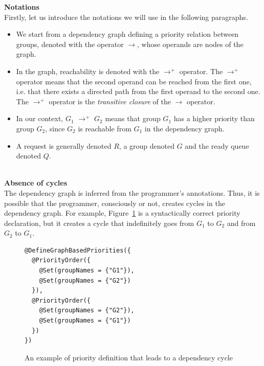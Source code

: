 \documentclass[11pt]{report}
\begin{document}
\textbf{Notations}\\
Firstly, let us introduce the notations we will use in the following paragraphs. 
\begin{itemize}
\item We start from a dependency graph defining a priority relation between groups, denoted with the operator $\longrightarrow$, whose operands are nodes of the graph.
\item In the graph, reachability is denoted with the $\longrightarrow^{+}$ operator. The $\longrightarrow^{+}$ operator means that the second operand can be reached from the first one, i.e. that there exists a directed path from the first operand to the second one. The $\longrightarrow^{+}$ operator is the \emph{transitive closure} of the $\longrightarrow$ operator.
\item In our context, $G_1$ $\longrightarrow^{+}$ $G_2$ means that group $G_1$ has a higher priority than group $G_2$, since $G_2$ is reachable from $G_1$ in the dependency graph.
\item A request is generally denoted $R$, a group denoted $G$ and the ready queue denoted $Q$.
\end{itemize}\\

\textbf{Absence of cycles}\\
The dependency graph is inferred from the programmer's annotations. Thus, it is possible that the programmer, consciously or not, creates cycles in the dependency graph. For example, Figure~\ref{fig:cycle} is a  syntactically correct priority declaration, but it creates a cycle that indefinitely goes from $G_1$ to $G_2$ and from $G_2$ to $G_1$.

\begin{figure}[!ht]
	\lstset{language=java, numbers=left, numberstyle=\tiny, stepnumber=1, numbersep=5pt, basicstyle=\footnotesize}
	\begin{lstlisting}[frame=single]
@DefineGraphBasedPriorities({
  @PriorityOrder({
    @Set(groupNames = {"G1"}),
    @Set(groupNames = {"G2"})
  }),
  @PriorityOrder({
    @Set(groupNames = {"G2"}),
    @Set(groupNames = {"G1"})
  })
})
 	\end{lstlisting}
\caption{An example of priority definition that leads to a dependency cycle}
\label{fig:cycle}
\end{figure}
\end{document}
